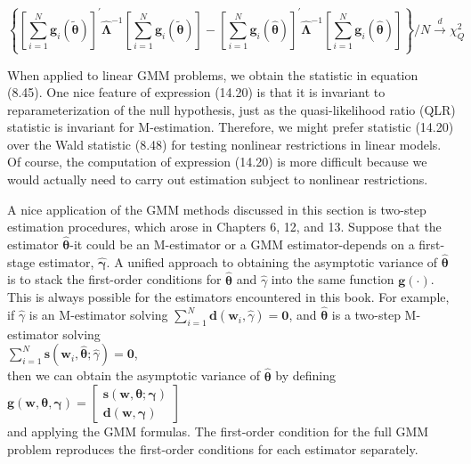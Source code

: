 \documentclass[10pt]{article}
\begin{document}
\begin{equation*}
\left\{\left[\sum_{i=1}^{N} \mathbf{g}_{i}(\tilde{\boldsymbol{\theta}})\right]^{\prime} \hat{\boldsymbol{\Lambda}}^{-1}\left[\sum_{i=1}^{N} \mathbf{g}_{i}(\tilde{\boldsymbol{\theta}})\right]-\left[\sum_{i=1}^{N} \mathbf{g}_{i}(\hat{\boldsymbol{\theta}})\right]^{\prime} \hat{\boldsymbol{\Lambda}}^{-1}\left[\sum_{i=1}^{N} \mathbf{g}_{i}(\hat{\boldsymbol{\theta}})\right]\right\} / N \xrightarrow{d} \chi_{Q}^{2} \tag{14.20}
\end{equation*}


When applied to linear GMM problems, we obtain the statistic in equation (8.45). One nice feature of expression (14.20) is that it is invariant to reparameterization of the null hypothesis, just as the quasi-likelihood ratio (QLR) statistic is invariant for M-estimation. Therefore, we might prefer statistic (14.20) over the Wald statistic (8.48) for testing nonlinear restrictions in linear models. Of course, the computation of expression (14.20) is more difficult because we would actually need to carry out estimation subject to nonlinear restrictions.

A nice application of the GMM methods discussed in this section is two-step estimation procedures, which arose in Chapters 6, 12, and 13. Suppose that the estimator $\hat{\boldsymbol{\theta}}$-it could be an M-estimator or a GMM estimator-depends on a first-stage estimator, $\hat{\boldsymbol{\gamma}}$. A unified approach to obtaining the asymptotic variance of $\hat{\boldsymbol{\theta}}$ is to stack the first-order conditions for $\hat{\boldsymbol{\theta}}$ and $\hat{\gamma}$ into the same function $\mathbf{g}(\cdot)$. This is always possible for the estimators encountered in this book. For example, if $\hat{\gamma}$ is an M-estimator solving $\sum_{i=1}^{N} \mathbf{d}\left(\mathbf{w}_{i}, \hat{\gamma}\right)=\mathbf{0}$, and $\hat{\boldsymbol{\theta}}$ is a two-step M-estimator solving\\
$\sum_{i=1}^{N} \mathbf{s}\left(\mathbf{w}_{i}, \hat{\boldsymbol{\theta}} ; \hat{\gamma}\right)=\mathbf{0}$,\\
then we can obtain the asymptotic variance of $\hat{\boldsymbol{\theta}}$ by defining\\
$\mathbf{g}(\mathbf{w}, \boldsymbol{\theta}, \boldsymbol{\gamma})=\left[\begin{array}{c}\mathbf{s}(\mathbf{w}, \boldsymbol{\theta} ; \boldsymbol{\gamma}) \\ \mathbf{d}(\mathbf{w}, \boldsymbol{\gamma})\end{array}\right]$\\
and applying the GMM formulas. The first-order condition for the full GMM problem reproduces the first-order conditions for each estimator separately.
\end{document}
